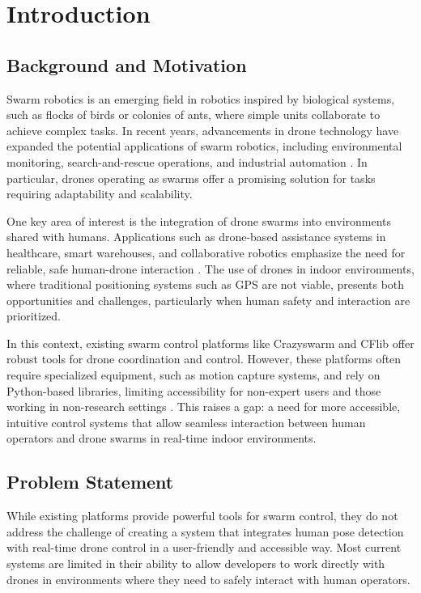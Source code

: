 \tableofcontents
\section{Introduction}

\subsection{Background and Motivation}

Swarm robotics is an emerging field in robotics inspired by biological systems, such as flocks of birds or colonies of ants, where simple units collaborate to achieve complex tasks. In recent years, advancements in drone technology have expanded the potential applications of swarm robotics, including environmental monitoring, search-and-rescue operations, and industrial automation \cite{swarm_survey}. In particular, drones operating as swarms offer a promising solution for tasks requiring adaptability and scalability.

One key area of interest is the integration of drone swarms into environments shared with humans. Applications such as drone-based assistance systems in healthcare, smart warehouses, and collaborative robotics emphasize the need for reliable, safe human-drone interaction \cite{swarm_survey}. The use of drones in indoor environments, where traditional positioning systems such as GPS are not viable, presents both opportunities and challenges, particularly when human safety and interaction are prioritized.

In this context, existing swarm control platforms like Crazyswarm and CFlib offer robust tools for drone coordination and control. However, these platforms often require specialized equipment, such as motion capture systems, and rely on Python-based libraries, limiting accessibility for non-expert users and those working in non-research settings \cite{crazyflie,bitcraze_cflib}. This raises a gap: a need for more accessible, intuitive control systems that allow seamless interaction between human operators and drone swarms in real-time indoor environments.

\subsection{Problem Statement}

While existing platforms provide powerful tools for swarm control, they do not address the challenge of creating a system that integrates human pose detection with real-time drone control in a user-friendly and accessible way. Most current systems are limited in their ability to allow developers to work directly with drones in environments where they need to safely interact with human operators.

